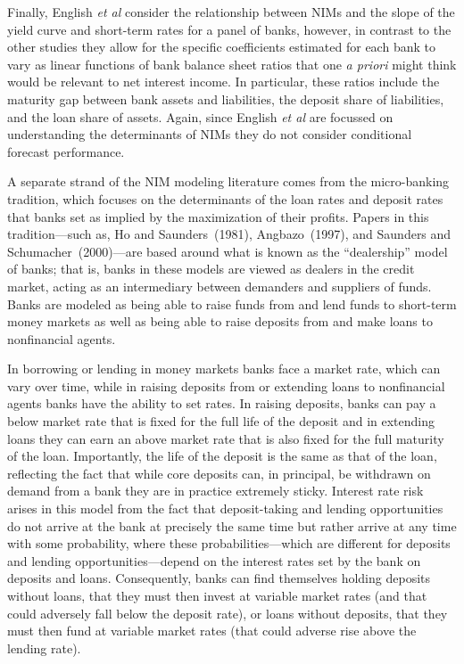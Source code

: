 \documentclass[11pt]{article}
\begin{document}
Finally, English \textit{et al} consider the relationship between NIMs and the slope of the yield curve and short-term rates for a panel of banks, however, in contrast to the other studies they allow for the specific coefficients estimated for each bank to vary as linear functions of bank balance sheet ratios that one \textit{a priori} might think would be relevant to net interest income.  In particular, these ratios include the maturity gap between bank assets and liabilities, the deposit share of liabilities, and the loan share of assets. Again, since English \textit{et al} are focussed on understanding the determinants of NIMs they do not consider conditional forecast performance.

  A separate strand of the NIM modeling literature comes from the micro-banking tradition, which focuses on the determinants of the loan rates and deposit rates that banks set as implied by the maximization of their profits. Papers in this tradition---such as, Ho and Saunders~(1981), Angbazo~(1997), and Saunders and Schumacher~(2000)---are based around what is known as the ``dealership'' model of banks; that is, banks in these models are viewed as dealers in the credit market, acting as an intermediary between demanders and suppliers of funds.  Banks are modeled as being able to raise funds from and lend funds to short-term money markets as well as being able to raise deposits from and make loans to nonfinancial agents.

In borrowing or lending in money markets banks face a market rate, which can vary over time, while in raising deposits from or extending loans to nonfinancial agents banks have the ability to set rates.  In raising deposits, banks can pay a below market rate that is fixed for the full life of the deposit and in extending loans they can earn an above market rate that is also fixed for the full maturity of the loan.  Importantly, the life of the deposit is the same as that of the loan, reflecting the fact that while core deposits can, in principal, be withdrawn on demand from a bank they are in practice extremely sticky.  Interest rate risk arises in this model from the fact that deposit-taking and lending opportunities do not arrive at the bank at precisely the same time but rather arrive at any time with some probability, where these probabilities---which are different for deposits and lending opportunities---depend on the interest rates set by the bank on deposits and loans.  Consequently, banks can find themselves holding deposits without loans, that they must then invest at variable market rates (and that could adversely fall below the deposit rate), or loans without deposits, that they must then fund at variable market rates (that could adverse rise above the lending rate).
\end{document}

